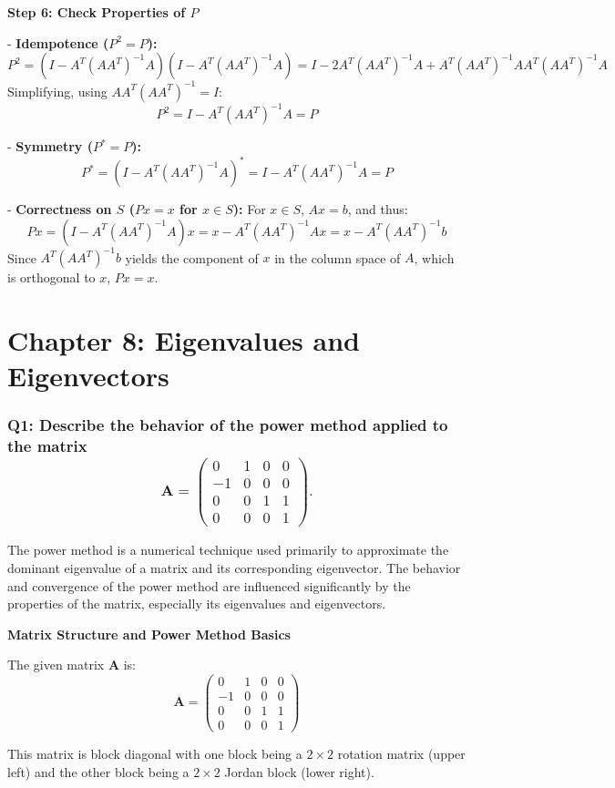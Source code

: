 \documentclass[8pt]{article}
\begin{document}
{\textbf{Step 6: Check Properties of \(P\)}

- \textbf{Idempotence (\(P^2 = P\)):}
\[
P^2 = (I - A^T (AA^T)^{-1} A)(I - A^T (AA^T)^{-1} A) = I - 2A^T (AA^T)^{-1} A + A^T (AA^T)^{-1} AA^T (AA^T)^{-1} A
\]
Simplifying, using \(AA^T (AA^T)^{-1} = I\):
\[
P^2 = I - A^T (AA^T)^{-1} A = P
\]

- \textbf{Symmetry (\(P^* = P\)):}
\[
P^* = (I - A^T (AA^T)^{-1} A)^* = I - A^T (AA^T)^{-1} A = P
\]

- \textbf{Correctness on \(S\) (\(Px = x\) for \(x \in S\)):}
For \(x \in S\), \(Ax = b\), and thus:
\[
Px = (I - A^T (AA^T)^{-1} A)x = x - A^T (AA^T)^{-1} Ax = x - A^T (AA^T)^{-1}b
\]
Since \(A^T (AA^T)^{-1}b\) yields the component of \(x\) in the column space of \(A\), which is orthogonal to \(x\), \(Px = x\).

\newpage
\section*{Chapter 8: Eigenvalues and Eigenvectors}

\subsubsection*{Q1: Describe the behavior of the power method applied to the matrix
\[ 
\mathbf{A} = 
\begin{pmatrix}
0 & 1 & 0 & 0 \\
-1 & 0 & 0 & 0 \\
0 & 0 & 1 & 1 \\
0 & 0 & 0 & 1 
\end{pmatrix}. 
\]}

The power method is a numerical technique used primarily to approximate the dominant eigenvalue of a matrix and its corresponding eigenvector. The behavior and convergence of the power method are influenced significantly by the properties of the matrix, especially its eigenvalues and eigenvectors.

\textbf{Matrix Structure and Power Method Basics}

The given matrix \(\mathbf{A}\) is:
\[
\mathbf{A} = 
\begin{pmatrix}
0 & 1 & 0 & 0 \\
-1 & 0 & 0 & 0 \\
0 & 0 & 1 & 1 \\
0 & 0 & 0 & 1 
\end{pmatrix}
\]

This matrix is block diagonal with one block being a \(2 \times 2\) rotation matrix (upper left) and the other block being a \(2 \times 2\) Jordan block (lower right).

}
\end{document}
